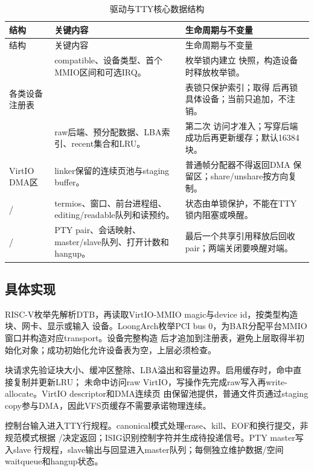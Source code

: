 \begin{longtable}{L{3.4cm}L{5.1cm}L{4.4cm}}
  \caption{驱动与TTY核心数据结构}\label{tab:driver-structures}\\
  \toprule
  结构 & 关键内容 & 生命周期与不变量 \\
  \midrule
  \endfirsthead
  \toprule
  结构 & 关键内容 & 生命周期与不变量 \\
  \midrule
  \endhead
   & compatible、设备类型、首个MMIO区间和可选IRQ。 & 枚举锁内建立
  快照，构造设备时释放枚举锁。\\
  各类设备注册表 &  & 表锁只保护索引；取得
  后再锁具体设备；当前只追加，不注销。\\
   & raw后端、预分配数据、LBA索引、recent集合和LRU。 & 第二次
  访问才准入；写穿后端成功后再更新缓存；默认16384块。\\
  VirtIO DMA区 & linker保留的连续页池与staging buffer。 & 普通帧分配器不得返回DMA
  保留区；share/unshare按方向复制。\\
  / & termios、窗口、前台进程组、editing/readable队列和读预约。 &
  状态由单锁保护，不能在TTY锁内阻塞或唤醒。\\
   & PTY pair、会话映射、master/slave队列、打开计数和hangup。 &
  最后一个共享引用释放后回收pair；两端关闭要唤醒对端。\\
  \bottomrule
\end{longtable}

\subsection{具体实现}

RISC-V枚举先解析DTB，再读取VirtIO-MMIO magic与device id，按类型构造块、网卡、显示或输入
设备。LoongArch枚举PCI bus 0，为BAR分配平台MMIO窗口并构造对应transport。设备完整构造
后才追加到注册表，避免上层取得半初始化对象；成功初始化允许设备表为空，上层必须检查。

块请求先验证块大小、缓冲区整除、LBA溢出和容量边界。启用缓存时，命中直接复制并更新LRU；
未命中访问raw VirtIO，写操作先完成raw写入再write-allocate。VirtIO descriptor和DMA连续页
由保留池提供，普通文件页通过staging copy参与DMA，因此VFS页缓存不需要承诺物理连续。

控制台输入进入TTY行规程。canonical模式处理erase、kill、EOF和换行提交，非规范模式根据
/决定返回；ISIG识别控制字符并生成待投递信号。PTY master写入slave
行规程，slave输出与回显进入master队列；每侧独立维护数据/空间waitqueue和hangup状态。

